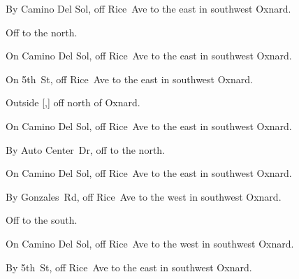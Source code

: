 
\begin{LocationList}

By Camino Del Sol, off Rice~Ave to the east in southwest Oxnard.

Off  to the north.

On Camino Del Sol, off Rice~Ave to the east in southwest Oxnard.

On  5th~St, off Rice~Ave to the east in southwest Oxnard.

Outside [,] off  north of Oxnard.

\Location{\GasStation \Gas \Weigh}
On Camino Del Sol, off Rice~Ave to the east in southwest Oxnard.

By Auto Center~Dr, off   to the north.

On Camino Del Sol, off Rice~Ave to the east in southwest Oxnard.

By Gonzales~Rd, off Rice~Ave to the west in southwest Oxnard.

Off  to the south.

On Camino Del Sol, off Rice~Ave to the west in southwest Oxnard.

By  5th~St, off Rice~Ave to the east in southwest Oxnard.

\end{LocationList}
